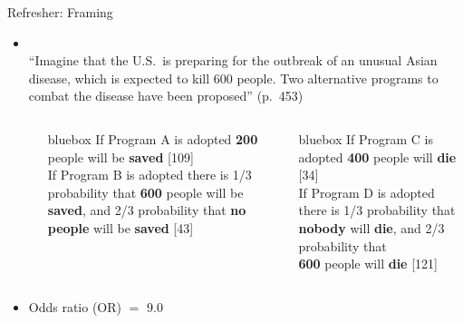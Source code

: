 \documentclass[aspectratio=169]{beamer}
\newenvironment{colbox}[1][\textwidth]%
  {\begin{beamercolorbox}[wd=#1, rounded=true, shadow=true]{bluebox}}
  {\end{beamercolorbox}}
\begin{document}
\begin{frame}{Refresher: Framing}

\begin{itemize}
\item \citet{ TverskyKahneman81}\\[1ex]

``Imagine that the U.S.\ is preparing for the outbreak of an unusual Asian
disease, which is expected to kill 600 people. Two alternative programs to
combat the disease have been proposed'' (p.~453)\\[1ex]

\begin{columns}
\begin{column}{0.4 cm}
\end{column}
%
\begin{column}{5.8 cm}
\begin{colbox}
If Program A is adopted \textbf{200} people will be \textbf{saved} [109]\\[2ex]

If Program B is adopted there is 1/3 probability that \textbf{600} people
will be \textbf{saved}, and 2/3 probability that \textbf{no people} will be
\textbf{saved} [43]
\end{colbox}
\end{column}
%
\begin{column}{5.8 cm}
\begin{colbox}
If Program C is adopted \textbf{400} people will
\textbf{die} [34]\\[2ex]

If Program D is adopted there is 1/3 probability that \textbf{nobody} will
\textbf{die}, and 2/3 probability that\\
\textbf{600} people will \textbf{die} [121]
\end{colbox}
\end{column}
\end{columns}

\vspace{2ex}

\item Odds ratio (OR) $=$ 9.0
\end{itemize}
\end{frame}

\end{document}
